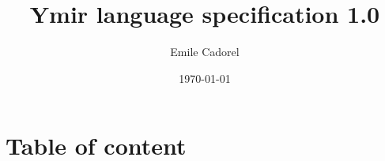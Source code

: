 \documentclass[twoside,a4paper,11pt]{book}
\author{Emile Cadorel}
\date{\today}
\title{Ymir language specification 1.0}
\begin{document}
\setlength{\aweboxleftmargin}{0.05\linewidth}
\setlength{\aweboxcontentwidth}{0.93\linewidth}


\maketitle
\dominitoc
\dominilof
\dominilot



\section*{Table of content}
%
\tableofcontents
%



\end{document}
